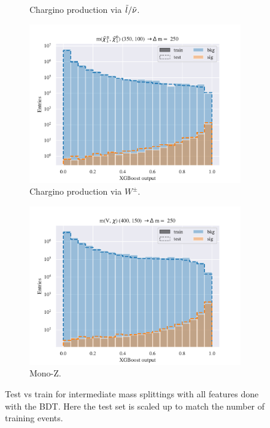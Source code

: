 \begin{figure}[H]
\begin{subfigure}[t!]{0.49\textwidth}
        \caption{Chargino production via $\Tilde{l}/\Tilde{\nu}$.}
        \label{fig:SlepsnuInter}
    \end{subfigure}
    \begin{subfigure}[t!]{0.49\textwidth}
        \includegraphics[width = \textwidth]{Figures/WW/BDT/All_level/Inter/scaled_train_test_395320.pdf}
        \caption{Chargino production via $W^\pm$.}
        \label{fig:WWInter}
    \end{subfigure}
    \begin{subfigure}[t!]{0.49\textwidth}
        \includegraphics[width = \textwidth]{Figures/Mono_Z/ML/BDT/All_level/Inter/scaled_train_test_310613.pdf}
        \caption{Mono-Z.}
        \label{fig:MonoInter}
    \end{subfigure}
    \caption{Test vs train for intermediate mass splittings with all features done with the BDT. Here the test set is scaled up to match the number of training events.}
    \label{fig:AllInterBDT}
\end{figure}


